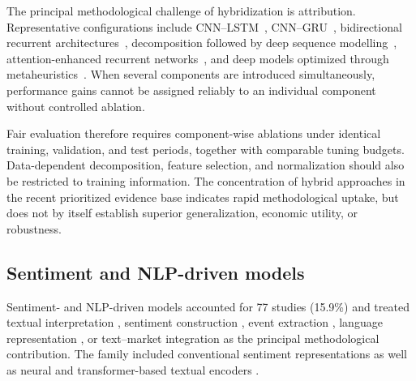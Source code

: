 \documentclass[12pt]{article}
\numberwithin{equation}{section}
\begin{document}
The principal methodological challenge of hybridization is attribution.
Representative configurations include CNN--LSTM~\cite{P00673,P00685,P00705,P00745,P00752,P00763,P00775,P00807,P00838,P00842,P00845,P00846},
CNN--GRU~\cite{P00860,P00866,P00872,P00878,P00890,P00891,P00909,P00910,P00930,P00931,P00943,P00947}, bidirectional recurrent architectures~\cite{P00951,P00956,P00964,P00974,P00984,P01069,P01082,P01094,P01112,P01126,P01131,P01168},
decomposition followed by deep sequence modelling~\cite{P02877,P02956,P02991,P02999,P03006,P03106,P03317,P03366,P03386,P03508,P03964,P04069},
attention-enhanced recurrent networks~\cite{P00220,P00228,P00237,P00250}, and deep models optimized
through metaheuristics~\cite{P03366,P03386,P03508}. When several components are introduced
simultaneously, performance gains cannot be assigned reliably to an individual
component without controlled ablation.


Fair evaluation therefore requires component-wise ablations under
identical training, validation, and test periods, together with comparable
tuning budgets. Data-dependent decomposition, feature selection, and
normalization should also be restricted to training information. The
concentration of hybrid approaches in the recent prioritized evidence base
indicates rapid methodological uptake, but does not by itself establish
superior generalization, economic utility, or robustness.

\subsection{Sentiment and NLP-driven models}
\label{sec:supp-sentiment-nlp}

Sentiment- and NLP-driven models accounted for 77 studies (15.9\%) and
treated textual interpretation \cite{P00070,P00088,P00098,P00108,P00141}, sentiment construction \cite{P03037,P03139,P03350,P03353,P03705,P03742,P03834,P03861,P03966,P04573}, event extraction \cite{P01662,P02324,P02642,P02841},
language representation \cite{P00832,P00854,P00907}, or text--market integration \cite{P00011,P00046,P00059,P00070,P00088,P00098,P00108,P00141,P00146,P00157,P00178,P00201} as the principal
methodological contribution. The family included conventional sentiment
representations \cite{P00213,P00224,P00253,P00254,P00261,P00267,P00296,P00307,P00343,P00367,P00380} as well as neural \cite{P00797,P00832,P00854,P00907,P00944,P00965,P00970,P01048,P01060,P01120,P01125,P01169,P01198,P01224,P01228,P01276,P01304,P01500,P01662,P02324,P02642,P02841,P02918,P02948} and transformer-based textual encoders \cite{P00388,P00411,P00495,P00544,P00561,P00577,P00585,P00597,P00601,P00603,P00605,P00611,P00625,P00639,P00647,P00706,P00708,P00722,P00725,P00726,P00758,P00778}.
\end{document}
